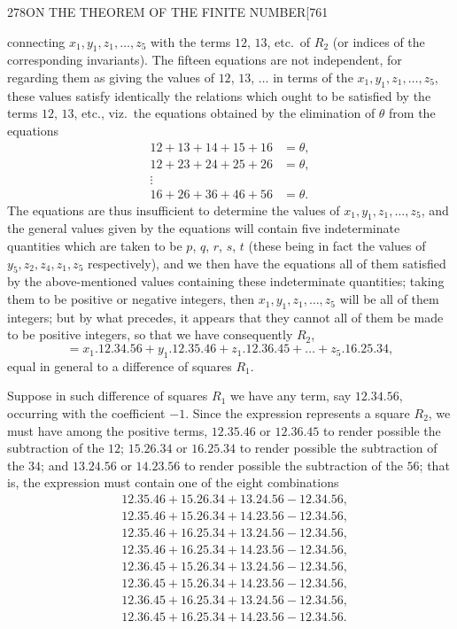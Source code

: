 \documentclass[11pt]{article}
\begin{document}
\newpage
\begin{center}\small 278\quad ON THE THEOREM OF THE FINITE NUMBER\hfill [761\end{center}
\noindent
connecting $x_{1}, y_{1}, z_{1}, \ldots, z_{5}$ with the terms $12$, $13$,
etc.\ of $R_{2}$ (or indices of the corresponding invariants). The fifteen
equations are not independent, for regarding them as giving the values of
$12$, $13$, $\ldots$ in terms of the $x_{1}, y_{1}, z_{1}, \ldots, z_{5}$,
these values satisfy identically the relations which ought to be satisfied
by the terms $12$, $13$, etc., viz.\ the equations obtained by the
elimination of $\theta$ from the equations
\begin{align*}
  12 + 13 + 14 + 15 + 16 &= \theta, \\
  12 + 23 + 24 + 25 + 26 &= \theta, \\
  \vdots\\
  16 + 26 + 36 + 46 + 56 &= \theta.
\end{align*}
The equations are thus insufficient to determine the values of $x_{1}, y_{1},
z_{1}, \ldots, z_{5}$, and the general values given by the equations will
contain five indeterminate quantities which are taken to be $p$, $q$, $r$,
$s$, $t$ (these being in fact the values of $y_{5}, z_{2}, z_{4}, z_{1},
z_{5}$ respectively), and we then have the equations all of them satisfied
by the above-mentioned values containing these indeterminate quantities;
taking them to be positive or negative integers, then $x_{1}, y_{1}, z_{1},
\ldots, z_{5}$ will be all of them integers; but by what precedes, it
appears that they cannot all of them be made to be positive integers, so
that we have consequently $R_{2}$,
\[
  = x_{1}.12.34.56 + y_{1}.12.35.46 + z_{1}.12.36.45 + \ldots + z_{5}.16.25.34,
\]
equal in general to a difference of squares $R_{1}$.

Suppose in such difference of squares $R_{1}$ we have any term, say
$12.34.56$, occurring with the coefficient $-1$. Since the expression
represents a square $R_{2}$, we must have among the positive terms,
$12.35.46$ or $12.36.45$ to render possible the subtraction of the $12$;
$15.26.34$ or $16.25.34$ to render possible the subtraction of the $34$;
and $13.24.56$ or $14.23.56$ to render possible the subtraction of the
$56$; that is, the expression must contain one of the eight combinations
\begin{align*}
  & 12.35.46 + 15.26.34 + 13.24.56 - 12.34.56,\\
  & 12.35.46 + 15.26.34 + 14.23.56 - 12.34.56,\\
  & 12.35.46 + 16.25.34 + 13.24.56 - 12.34.56,\\
  & 12.35.46 + 16.25.34 + 14.23.56 - 12.34.56,\\
  & 12.36.45 + 15.26.34 + 13.24.56 - 12.34.56,\\
  & 12.36.45 + 15.26.34 + 14.23.56 - 12.34.56,\\
  & 12.36.45 + 16.25.34 + 13.24.56 - 12.34.56,\\
  & 12.36.45 + 16.25.34 + 14.23.56 - 12.34.56.
\end{align*}
\end{document}
